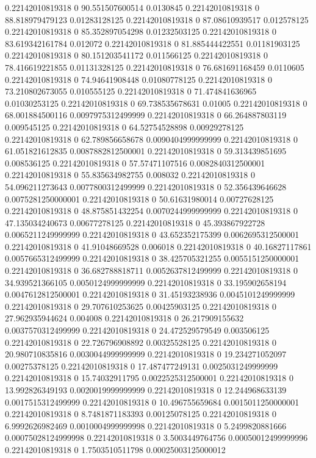 0.22142010819318 0 90.551507600514 0.0130845
0.22142010819318 0 88.818979479123 0.01283128125
0.22142010819318 0 87.08610939517 0.012578125
0.22142010819318 0 85.352897054298 0.01232503125
0.22142010819318 0 83.619342161784 0.012072
0.22142010819318 0 81.885444422551 0.01181903125
0.22142010819318 0 80.151203541172 0.011566125
0.22142010819318 0 78.416619221855 0.01131328125
0.22142010819318 0 76.681691168459 0.0110605
0.22142010819318 0 74.94641908448 0.01080778125
0.22142010819318 0 73.210802673055 0.010555125
0.22142010819318 0 71.474841636965 0.01030253125
0.22142010819318 0 69.738535678631 0.01005
0.22142010819318 0 68.001884500116 0.0097975312499999
0.22142010819318 0 66.264887803119 0.009545125
0.22142010819318 0 64.52754528898 0.00929278125
0.22142010819318 0 62.789856658678 0.0090404999999999
0.22142010819318 0 61.051821612835 0.0087882812500001
0.22142010819318 0 59.313439851695 0.008536125
0.22142010819318 0 57.57471107516 0.0082840312500001
0.22142010819318 0 55.835634982755 0.008032
0.22142010819318 0 54.096211273643 0.0077800312499999
0.22142010819318 0 52.356439646628 0.0075281250000001
0.22142010819318 0 50.61631980014 0.00727628125
0.22142010819318 0 48.875851432254 0.0070244999999999
0.22142010819318 0 47.135034240673 0.00677278125
0.22142010819318 0 45.393867922728 0.0065211249999999
0.22142010819318 0 43.652352175399 0.0062695312500001
0.22142010819318 0 41.91048669528 0.006018
0.22142010819318 0 40.16827117861 0.0057665312499999
0.22142010819318 0 38.425705321255 0.0055151250000001
0.22142010819318 0 36.682788818711 0.0052637812499999
0.22142010819318 0 34.939521366105 0.0050124999999999
0.22142010819318 0 33.195902658194 0.0047612812500001
0.22142010819318 0 31.45193238936 0.0045101249999999
0.22142010819318 0 29.707610253625 0.00425903125
0.22142010819318 0 27.962935944624 0.004008
0.22142010819318 0 26.217909155632 0.0037570312499999
0.22142010819318 0 24.472529579549 0.003506125
0.22142010819318 0 22.726796908892 0.00325528125
0.22142010819318 0 20.980710835816 0.0030044999999999
0.22142010819318 0 19.234271052097 0.00275378125
0.22142010819318 0 17.487477249131 0.0025031249999999
0.22142010819318 0 15.74032911795 0.0022525312500001
0.22142010819318 0 13.992826349193 0.0020019999999999
0.22142010819318 0 12.244968633139 0.0017515312499999
0.22142010819318 0 10.496755659684 0.0015011250000001
0.22142010819318 0 8.7481871183393 0.00125078125
0.22142010819318 0 6.9992626982469 0.0010004999999998
0.22142010819318 0 5.2499820881666 0.00075028124999998
0.22142010819318 0 3.5003449764756 0.00050012499999996
0.22142010819318 0 1.7503510511798 0.00025003125000012

